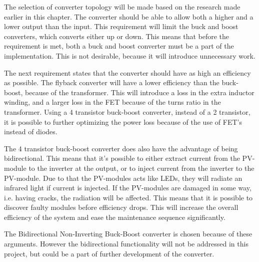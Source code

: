 
The selection of converter topology will be made based on the research made earlier in this chapter. The converter should be able to allow both a higher and a lower output than the input. This requirement will limit the buck and boost converters, which converts either up or down. This means that before the requirement is met, both a buck and boost converter must be a part of the implementation. This is not desirable, because it will introduce unnecessary work.  

The next requirement states that the converter should have as high an efficiency as possible. The flyback converter will have a lower efficiency than the buck-boost, because of the transformer. This will introduce a loss in the extra inductor winding, and a larger loss in the FET because of the turns ratio in the transformer. Using a 4 transistor buck-boost converter, instead of a 2 transistor, it is possible to further optimizing the power loss because of the use of FET's instead of diodes. 

The 4 transistor buck-boost converter does also have the advantage of being bidirectional. This means that it's possible to either extract current from the PV-module to the inverter at the output, or to inject current from the inverter to the PV-module. Due to that the PV-modules acts like LEDs, they will radiate an infrared light if current is injected. If the PV-modules are damaged in some way, i.e. having cracks, the radiation will be affected. This means that it is possible to discover faulty modules before efficiency drops. This will increase the overall efficiency of the system and ease the maintenance sequence significantly. 

The Bidirectional Non-Inverting Buck-Boost converter is chosen because of these arguments. However the bidirectional functionality will not be addressed in this project, but could be a part of further development of the converter. 






 